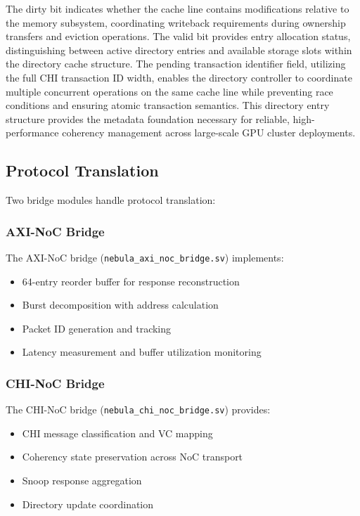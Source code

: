 \documentclass[12pt,letterpaper]{article}
\begin{document}
The dirty bit indicates whether the cache line contains modifications relative to the memory subsystem, coordinating writeback requirements during ownership transfers and eviction operations. The valid bit provides entry allocation status, distinguishing between active directory entries and available storage slots within the directory cache structure. The pending transaction identifier field, utilizing the full CHI transaction ID width, enables the directory controller to coordinate multiple concurrent operations on the same cache line while preventing race conditions and ensuring atomic transaction semantics. This directory entry structure provides the metadata foundation necessary for reliable, high-performance coherency management across large-scale GPU cluster deployments.

\subsection{Protocol Translation}

Two bridge modules handle protocol translation:

\subsubsection{AXI-NoC Bridge}

The AXI-NoC bridge (\texttt{nebula\_axi\_noc\_bridge.sv}) implements:

\begin{itemize}
    \item 64-entry reorder buffer for response reconstruction
    \item Burst decomposition with address calculation
    \item Packet ID generation and tracking
    \item Latency measurement and buffer utilization monitoring
\end{itemize}

\subsubsection{CHI-NoC Bridge}

The CHI-NoC bridge (\texttt{nebula\_chi\_noc\_bridge.sv}) provides:

\begin{itemize}
    \item CHI message classification and VC mapping
    \item Coherency state preservation across NoC transport
    \item Snoop response aggregation
    \item Directory update coordination
\end{itemize}
\end{document}
